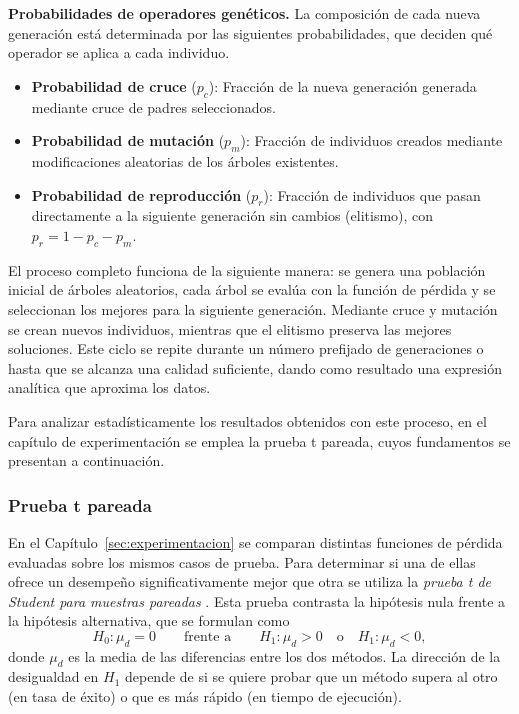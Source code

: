\documentclass{article}
\begin{document}
\medskip
\noindent\textbf{Probabilidades de operadores genéticos.}
La composición de cada nueva generación está determinada por las
siguientes probabilidades, que deciden qué operador se aplica a cada
individuo.

\begin{itemize}
    \item \textbf{Probabilidad de cruce} (\(p_c\)): Fracción de la
          nueva generación generada mediante cruce de padres
          seleccionados.

    \item \textbf{Probabilidad de mutación} (\(p_m\)): Fracción de
          individuos creados mediante modificaciones aleatorias de los
          árboles existentes.

    \item \textbf{Probabilidad de reproducción} (\(p_r\)): Fracción de
          individuos que pasan directamente a la siguiente generación
          sin cambios (elitismo), con \(p_r = 1 - p_c - p_m\).
\end{itemize}

El proceso completo funciona de la siguiente manera: se genera una
población inicial de árboles aleatorios, cada árbol se evalúa con la
función de pérdida y se seleccionan los mejores para la siguiente
generación. Mediante cruce y mutación se crean nuevos individuos,
mientras que el elitismo preserva las mejores soluciones. Este ciclo se
repite durante un número prefijado de generaciones o hasta que se
alcanza una calidad suficiente, dando como resultado una expresión
analítica que aproxima los datos.

Para analizar estadísticamente los resultados obtenidos con este
proceso, en el capítulo de experimentación se emplea la prueba t
pareada, cuyos fundamentos se presentan a continuación.

\subsubsection{Prueba t pareada}
\label{sec:prueba_t}

En el Capítulo~\ref{sec:experimentacion} se comparan distintas
funciones de pérdida evaluadas sobre los mismos casos de prueba. Para
determinar si una de ellas ofrece un desempeño significativamente mejor
que otra se utiliza la \textit{prueba t de Student para muestras
pareadas} \cite{montgomery2017applied}. Esta prueba contrasta la
hipótesis nula frente a la hipótesis alternativa, que se formulan como
\[
H_0 : \mu_d = 0 \qquad\text{frente a}\qquad
H_1 : \mu_d > 0 \quad\text{o}\quad H_1 : \mu_d < 0,
\]
donde \(\mu_d\) es la media de las diferencias entre los dos métodos.
La dirección de la desigualdad en \(H_1\) depende de si se quiere
probar que un método supera al otro (en tasa de éxito) o que es más
rápido (en tiempo de ejecución).
\end{document}
